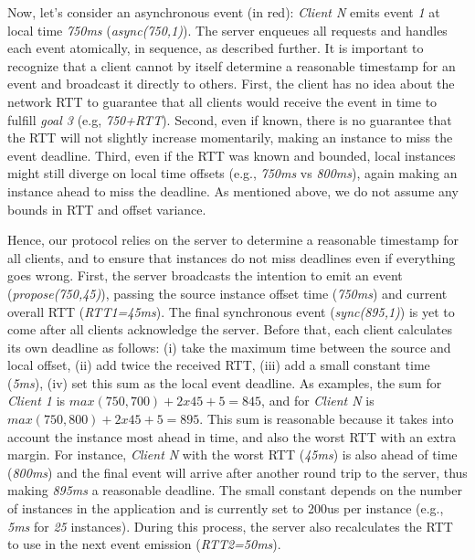 \documentclass[sigplan,screen]{acmart}
\begin{document}
Now, let's consider an asynchronous event (in red): \emph{Client N} emits event
\emph{1} at local time \emph{750ms} (\emph{async(750,1)}).
The server enqueues all requests and handles each event atomically, in
sequence, as described further.
%
It is important to recognize that a client cannot by itself determine a
reasonable timestamp for an event and broadcast it directly to others.
First, the client has no idea about the network RTT to guarantee that all
clients would receive the event in time to fulfill \emph{goal 3}
(e.g, \emph{750+RTT}).
Second, even if known, there is no guarantee that the RTT will not slightly
increase momentarily, making an instance to miss the event deadline.
Third, even if the RTT was known and bounded, local instances might still
diverge on local time offsets (e.g., \emph{750ms} vs \emph{800ms}), again
making an instance ahead to miss the deadline.
%
As mentioned above, we do not assume any bounds in RTT and offset variance.

Hence, our protocol relies on the server to determine a reasonable timestamp
for all clients, and to ensure that instances do not miss deadlines even if
everything goes wrong.
%
First, the server broadcasts the intention to emit an event
(\emph{propose(750,45)}), passing the source instance offset time
(\emph{750ms}) and current overall RTT (\emph{RTT1=45ms}).
The final synchronous event (\emph{sync(895,1)}) is yet to come after all
clients acknowledge the server.
Before that, each client calculates its own deadline as follows:
    (i)   take the maximum time between the source and local offset,
    (ii)  add twice the received RTT,
    (iii) add a small constant time (\emph{5ms}),
    (iv)  set this sum as the local event deadline.
As examples, the sum for
    \emph{Client 1} is $max(750,700)+2x45+5=845$, and for
    \emph{Client N} is $max(750,800)+2x45+5=895$.
%
This sum is reasonable because it takes into account
    the instance most ahead in time, and also
    the worst RTT with an extra margin.
For instance, \emph{Client N} with the worst RTT (\emph{45ms}) is also ahead of
time (\emph{800ms}) and the final event will arrive after another round trip to
the server, thus making \emph{895ms} a reasonable deadline.
%
The small constant depends on the number of instances in the application and is
currently set to 200us per instance (e.g., \emph{5ms} for \emph{25} instances).
%
During this process, the server also recalculates the RTT to use in the next
event emission (\emph{RTT2=50ms}).
\end{document}
